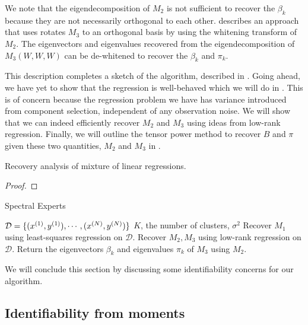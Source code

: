 We note that the eigendecomposition of $M_2$ is not sufficient to
recover the $\beta_k$ because they are not necessarily orthogonal to
each other. \citet{AnandkumarGeHsu2012} describes an approach that uses
rotates $M_3$ to an orthogonal basis by using the whitening transform of
$M_2$. The eigenvectors and eigenvalues recovered from the
eigendecomposition of $M_3(W, W, W)$ can be de-whitened to recover the
$\beta_k$ and $\pi_k$.

This description completes a sketch of the algorithm, described in
. Going ahead, we have yet to show
that the regression is well-behaved which we will do in
. This is of concern because the regression
problem we have has variance introduced from component selection,
independent of any observation noise. We will show that we can indeed
efficiently recover $M_2$ and $M_3$ using ideas from low-rank
regression. Finally, we will outline the tensor power method to recover
$B$ and $\pi$ given these two quantities, $M_2$ and $M_3$ in
. 

\begin{theorem}
  Recovery analysis of mixture of linear regressions.
\end{theorem}
\begin{proof}
\end{proof}

\begin{algorithm}[t]
  \caption{Spectral Experts}
  \label{algo:spectral-experts}
  \begin{algorithmic}[1]
    \REQUIRE $\mathcal{D} = \{ (x^{(1)}, y^{(1)}), \cdots, (x^{(N)}, y^{(N)}) \}$
    \REQUIRE $K$, the number of clusters, $\sigma^2$ 
    \STATE Recover $M_1$ using least-squares regression on $\mathcal{D}$.
    \STATE Recover $M_2, M_3$ using low-rank regression on $\mathcal{D}$.
    \STATE Return the eigenvectors $\beta_k$ and eigenvalues $\pi_k$ of $M_3$ using $M_2$.
  \end{algorithmic}
\end{algorithm}

We will conclude this section by
discussing some identifiability concerns for our algorithm.


\subsection{Identifiability from moments}

